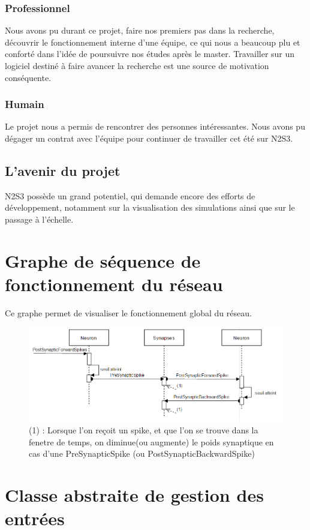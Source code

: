 \documentclass[a4paper,10pt]{article}
\begin{document}
\subsubsection*{Professionnel}
Nous avons pu durant ce projet, faire nos premiers pas dans la recherche, découvrir le fonctionnement interne d'une équipe, ce qui nous a beaucoup plu et conforté dans l'idée de poursuivre nos études après le master. Travailler sur un logiciel destiné à faire avancer la recherche est une source de motivation conséquente.

\subsubsection*{Humain}
Le projet nous a permis de rencontrer des personnes intéressantes. Nous avons pu dégager un contrat avec l'équipe pour continuer de travailler cet été sur N2S3.

\subsection*{L'avenir du projet}
N2S3 possède un grand potentiel, qui demande encore des efforts de développement, notamment sur la visualisation des simulations ainsi que sur le passage à l'échelle.

\newpage

\appendix
\section{Graphe de séquence de fonctionnement du réseau}
Ce graphe permet de visualiser le fonctionnement global du réseau.
\begin{figure}[h!]
\includegraphics[scale=0.70,center]{image/fcNetwork.png}
\caption{(1) : Lorsque l'on reçoit un spike, et que l'on se trouve dans la fenetre de temps, on diminue(ou augmente) le poids synaptique en cas d'une PreSynapticSpike (ou PostSynapticBackwardSpike)}
\end{figure}

\section{Classe abstraite de gestion des entrées}
\label{input_generator}

\end{document}
